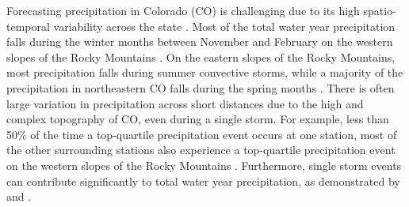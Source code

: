 \documentclass[draft]{agujournal2019}
\begin{document}
Forecasting precipitation in Colorado (CO) is challenging due to its high spatio-temporal variability across the state \cite{Cowie1986ColoradoAnalysis, Kirk2018LargeBasin, Lute2014RoleStates, Serreze2001CharacteristicsData}. Most of the total water year precipitation falls during the winter months between November and February on the western slopes of the Rocky Mountains \cite{Doesken1984Period., Harvey2019CitizensFrom}. On the eastern slopes of the Rocky Mountains, most precipitation falls during summer convective storms, while a majority of the precipitation in northeastern CO falls during the spring months \cite{Doesken1984Period., Harvey2019CitizensFrom}. There is often large variation in precipitation across short distances due to the high and complex topography of CO, even during a single storm. For example, less than 50\% of the time a top-quartile precipitation event occurs at one station, most of the other surrounding stations also experience a top-quartile precipitation event on the western slopes of the Rocky Mountains \cite{Serreze2001CharacteristicsData}. Furthermore, single storm events can contribute significantly to total water year precipitation, as demonstrated by  and .

\end{document}
